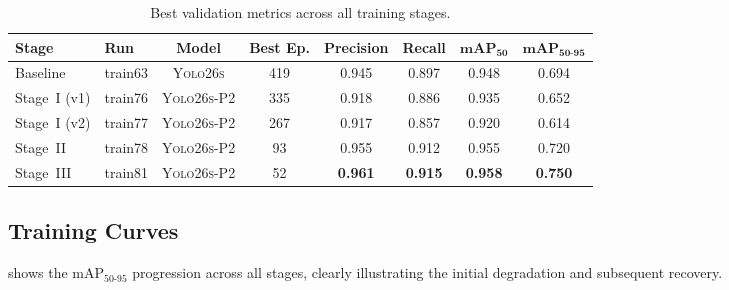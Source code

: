 \documentclass[11pt, a4paper]{article}
\newcommand{\mapfifty}{\text{mAP}_{50}}
\newcommand{\mapfull}{\text{mAP}_{50\text{-}95}}
\newcommand{\yolobase}{\textsc{Yolo26s}}
\newcommand{\yolop}{\textsc{Yolo26s-P2}}
\begin{document}
\begin{table}[h]
  \centering
  \caption{Best validation metrics across all training stages.}
  \label{tab:results}
  \begin{tabular}{@{}llcccccc@{}}
    \toprule
    \textbf{Stage}     & \textbf{Run}    & \textbf{Model}       & \textbf{Best Ep.} &
    \textbf{Precision} & \textbf{Recall} & $\mathbf{\mapfifty}$ &
    $\mathbf{\mapfull}$                                                                                                                                 \\
    \midrule
    Baseline           & train63         & \yolobase            & 419               & 0.945          & 0.897          & 0.948          & 0.694          \\
    \midrule
    Stage~I (v1)       & train76         & \yolop               & 335               & 0.918          & 0.886          & 0.935          & 0.652          \\
    Stage~I (v2)       & train77         & \yolop               & 267               & 0.917          & 0.857          & 0.920          & 0.614          \\
    \midrule
    Stage~II           & train78         & \yolop               & 93                & 0.955          & 0.912          & 0.955          & 0.720          \\
    \midrule
    Stage~III          & train81         & \yolop               & 52                & \textbf{0.961} & \textbf{0.915} & \textbf{0.958} & \textbf{0.750} \\
    \bottomrule
  \end{tabular}
\end{table}

\subsection{Training Curves}

 shows the $\mapfull$ progression across all
stages, clearly illustrating the initial degradation and subsequent
recovery.
\end{document}
